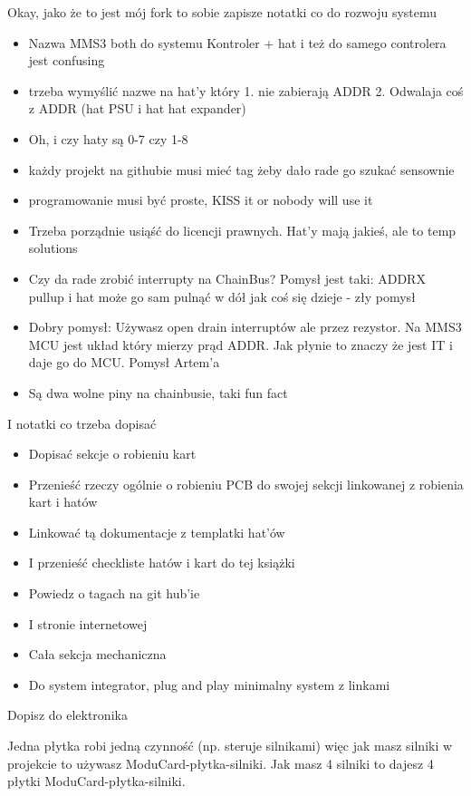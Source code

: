 \documentclass[b5paper, 10pt, twoside]{book}
\begin{document}
Okay, jako że to jest mój fork to sobie zapisze notatki co do rozwoju systemu

\begin{itemize}
  \item Nazwa MMS3 both do systemu Kontroler + hat i też do samego controlera jest confusing
  \item trzeba wymyślić nazwe na hat'y który 1. nie zabierają ADDR 2. Odwalaja coś z ADDR (hat PSU i hat hat expander)
  \item Oh, i czy haty są 0-7 czy 1-8
  \item każdy projekt na githubie musi mieć tag żeby dało rade go szukać sensownie
  \item programowanie musi być proste, KISS it or nobody will use it
  \item Trzeba porządnie usiąść do licencji prawnych. Hat'y mają jakieś, ale to temp solutions
  \item Czy da rade zrobić interrupty na ChainBus? Pomysł jest taki: ADDRX pullup i hat może go sam pulnąć w dół jak coś się dzieje - zły pomysł
  \item Dobry pomysł: Używasz open drain interruptów ale przez rezystor. Na MMS3 MCU jest układ który mierzy prąd ADDR. Jak płynie to znaczy że jest IT i daje go do MCU. Pomysł Artem'a
  \item Są dwa wolne piny na chainbusie, taki fun fact
\end{itemize}

I notatki co trzeba dopisać
\begin{itemize}
  \item Dopisać sekcje o robieniu kart
  \item Przenieść rzeczy ogólnie o robieniu PCB do swojej sekcji linkowanej z robienia kart i hatów
  \item Linkować tą dokumentacje z templatki hat'ów
  \item I przenieść checkliste hatów i kart do tej książki
  \item Powiedz o tagach na git hub'ie
  \item I stronie internetowej
  \item Cała sekcja mechaniczna
  \item Do system integrator, plug and play minimalny system z linkami
\end{itemize}

Dopisz do elektronika

Jedna płytka robi jedną czynność (np. steruje silnikami) więc jak masz silniki w projekcie to używasz ModuCard-płytka-silniki. Jak masz 4 silniki to dajesz 4 płytki ModuCard-płytka-silniki. 
\end{document}
